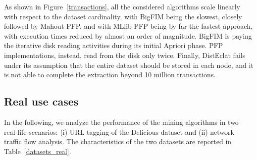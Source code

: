 As shown in Figure~\ref{transactions}, all the considered algorithms scale
linearly with respect to the dataset cardinality, with BigFIM being the slowest,
closely followed by Mahout PFP,
and with MLlib PFP being by far the fastest approach,
with execution times reduced by almost an order of magnitude.
BigFIM is paying the iterative disk reading activities
during its initial Apriori phase.
PFP implementations, instead, read from the disk only twice.
Finally, DistEclat fails under its assumption that the entire dataset should
be stored in each node, and it is not able to complete the extraction beyond
10 million transactions.

%







\subsection{Real use cases}
\label{usecases}

In the following, we analyze the performance of the mining algorithms in two
real-life scenarios:
(i) URL tagging of the Delicious dataset and
(ii) network traffic flow analysis.
The characteristics of the two datasets
are reported in Table~\ref{datasets_real}.

